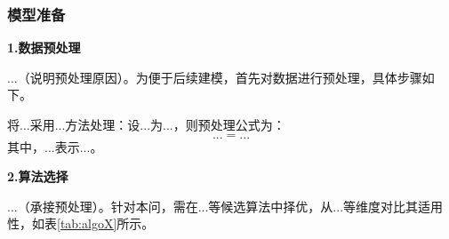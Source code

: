 
\subsubsection{模型准备}

\textbf{1.数据预处理}

...（说明预处理原因）。为便于后续建模，首先对数据进行预处理，具体步骤如下。

将...采用...方法处理：设...为...，则预处理公式为：
\begin{equation}
    ... = ...
\end{equation}
其中，$...$表示...。


\textbf{2.算法选择}

...（承接预处理）。针对本问，需在...等候选算法中择优，从...等维度对比其适用性，如表\ref{tab:algoX}所示。

